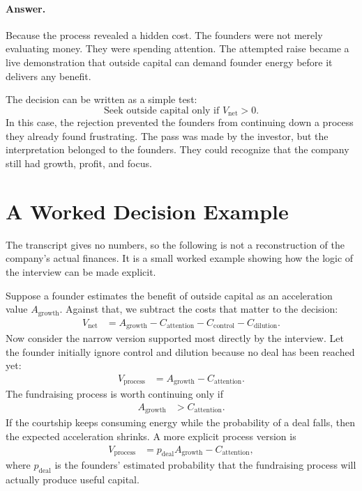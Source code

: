 \paragraph{Answer.}
Because the process revealed a hidden cost. The founders were not merely evaluating money. They were spending attention. The attempted raise became a live demonstration that outside capital can demand founder energy before it delivers any benefit.

The decision can be written as a simple test:
\begin{equation}
\text{Seek outside capital only if } V_{\mathrm{net}} > 0 .
\end{equation}
In this case, the rejection prevented the founders from continuing down a process they already found frustrating. The pass was made by the investor, but the interpretation belonged to the founders. They could recognize that the company still had growth, profit, and focus.

\section{A Worked Decision Example}

The transcript gives no numbers, so the following is not a reconstruction of the company's actual finances. It is a small worked example showing how the logic of the interview can be made explicit.

Suppose a founder estimates the benefit of outside capital as an acceleration value \(A_{\mathrm{growth}}\). Against that, we subtract the costs that matter to the decision:
\begin{align}
V_{\mathrm{net}}
&=
A_{\mathrm{growth}}
-
C_{\mathrm{attention}}
-
C_{\mathrm{control}}
-
C_{\mathrm{dilution}} .
\end{align}
Now consider the narrow version supported most directly by the interview. Let the founder initially ignore control and dilution because no deal has been reached yet:
\begin{align}
V_{\mathrm{process}}
&=
A_{\mathrm{growth}}
-
C_{\mathrm{attention}} .
\end{align}
The fundraising process is worth continuing only if
\begin{align}
A_{\mathrm{growth}} &> C_{\mathrm{attention}} .
\end{align}
If the courtship keeps consuming energy while the probability of a deal falls, then the expected acceleration shrinks. A more explicit process version is
\begin{align}
V_{\mathrm{process}}
&=
p_{\mathrm{deal}} A_{\mathrm{growth}}
-
C_{\mathrm{attention}},
\end{align}
where \(p_{\mathrm{deal}}\) is the founders' estimated probability that the fundraising process will actually produce useful capital.

